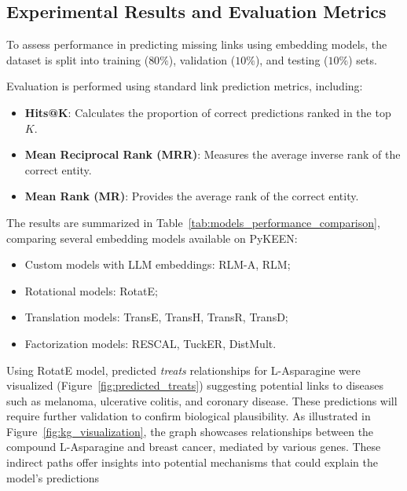 \subsection*{Experimental Results and Evaluation Metrics}

To assess performance in predicting missing links using embedding models, the dataset is split into training ($80\%$), validation ($10\%$), and testing ($10\%$) sets.

Evaluation is performed using standard link prediction metrics, including:

\begin{itemize}
    \item \textbf{Hits@K}: Calculates the proportion of correct predictions ranked in the top $K$. %
    \item \textbf{Mean Reciprocal Rank (MRR)}: Measures the average inverse rank of the correct entity. %
    \item \textbf{Mean Rank (MR)}: Provides the average rank of the correct entity. %
\end{itemize}

The results are summarized in Table~\ref{tab:models_performance_comparison}, comparing several embedding models available on PyKEEN:
\begin{itemize}
    \item Custom models with LLM embeddings: RLM-A, RLM;
    \item Rotational models: RotatE;
    \item Translation models: TransE, TransH, TransR, TransD;
    \item Factorization models: RESCAL, TuckER, DistMult.
\end{itemize}

Using RotatE model, predicted \textit{treats} relationships for L-Asparagine were visualized (Figure~\ref{fig:predicted_treats}) suggesting potential links to diseases such as melanoma, ulcerative colitis, and coronary disease. These predictions will require further validation to confirm biological plausibility. As illustrated in Figure~\ref{fig:kg_visualization}, the graph showcases relationships between the compound L-Asparagine and breast cancer, mediated by various genes. These indirect paths offer insights into potential mechanisms that could explain the model's predictions

